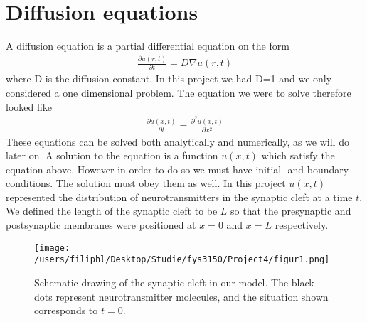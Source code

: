 \documentclass[norsk, a4paper]{article}
\begin{document}
\section{Diffusion equations}
A diffusion equation is a partial differential equation on the form
\begin{align*}
\frac{\partial u(r,t)}{\partial t} = D\nabla u(r,t)
\end{align*}
where D is the diffusion constant. In this project we had D=1 and we only considered a one dimensional problem. The equation we were to solve therefore looked like
\begin{align*}
\frac{\partial u(x,t)}{\partial t} = \frac{\partial^2 u(x,t)}{\partial x^2}
\end{align*}
These equations can be solved both analytically and numerically, as we will do later on. A solution to the equation is a function $u(x,t)$ which satisfy the equation above. However in order to do so we must have initial- and boundary conditions. The solution must obey them as well. In this project $u(x,t)$ represented the distribution of neurotransmitters in the synaptic cleft at a time $t$. We defined the length of the synaptic cleft to be $L$ so that the presynaptic and postsynaptic membranes were positioned at $x=0$ and $x=L$ respectively.
\begin{figure}[H]
\begin{center}
  \texttt{[image: /users/filiphl/Desktop/Studie/fys3150/Project4/figur1.png]}
  \caption{Schematic drawing of the synaptic cleft in our model. The black dots represent neurotransmitter molecules, and the situation shown corresponds to $t=0$.}\label{fig:illustration}
  \end{center}
\end{figure}
\end{document}
